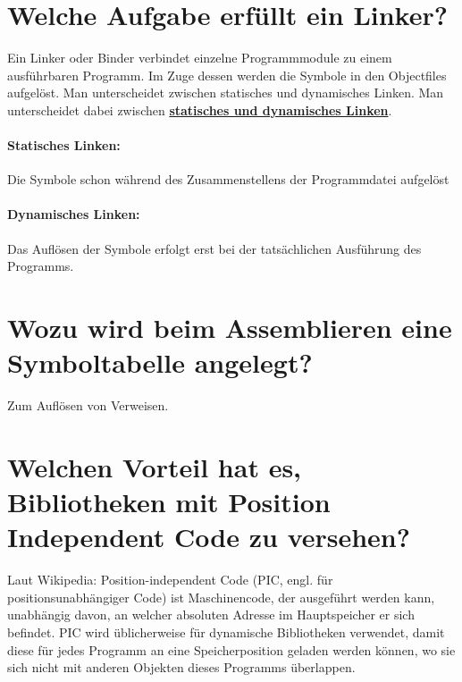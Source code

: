 \documentclass[12pt,a4paper,ngerman]{scrartcl}
\newcommand{\crucial}[1]{\textbf{\textcolor{crucial}{\uline{#1}}}}
\newcommand{\question}[1]{#1}
\newenvironment {answer}
                {}
                {}
\begin{document}
\section{\question{Welche Aufgabe erfüllt ein Linker?}}
\begin{answer}
Ein Linker oder Binder verbindet einzelne Programmmodule zu einem ausführbaren Programm. Im Zuge dessen werden die Symbole in den Objectfiles aufgelöst. Man unterscheidet zwischen statisches und dynamisches Linken. Man unterscheidet dabei zwischen \crucial{statisches und dynamisches Linken}.

\paragraph*{Statisches Linken:}
Die Symbole schon während des Zusammenstellens der Programmdatei aufgelöst

\paragraph*{Dynamisches Linken:}
Das Auflösen der Symbole erfolgt erst bei der tatsächlichen Ausführung des Programms.
\end{answer}

\section{\question{Wozu wird beim Assemblieren eine Symboltabelle angelegt?}}
\begin{answer}
Zum Auflösen von Verweisen.
\end{answer}

\section{\question{Welchen Vorteil hat es, Bibliotheken mit Position Independent Code zu versehen?}}
\begin{answer}
Laut Wikipedia: Position-independent Code (PIC, engl. für positionsunabhängiger Code) ist Maschinencode, der ausgeführt werden kann, unabhängig davon, an welcher absoluten Adresse im Hauptspeicher er sich befindet. PIC wird üblicherweise für dynamische Bibliotheken verwendet, damit diese für jedes Programm an eine Speicherposition geladen werden können, wo sie sich nicht mit anderen Objekten dieses Programms überlappen. 
\end{answer}
\end{document}
